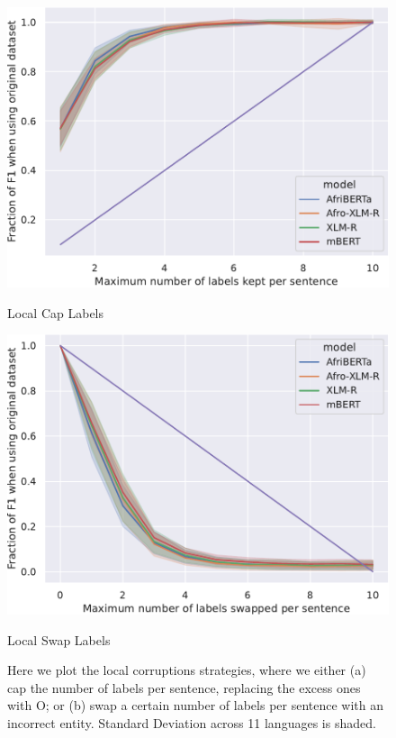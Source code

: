 \documentclass{article}
\begin{document}
\begin{figure}
    \centering
    \begin{minipage}[t]{0.45\linewidth}
        \centering
        \includegraphics[width=1\linewidth]{images/local_cap_labels.pdf}
        \caption{Local Cap Labels}
        \label{fig:local_cap_labels}
    \end{minipage}
    \begin{minipage}[t]{0.45\linewidth}
    \captionsetup{width=.8\linewidth}
        \centering
        \includegraphics[width=1\linewidth]{images/local_swap_labels.pdf}
        \caption{Local Swap Labels}
        \label{fig:local_swap_labels}
    \end{minipage}

    \caption*{Here we plot the local corruptions strategies, where we either (a) cap the number of labels per sentence, replacing the excess ones with O; or (b) swap a certain number of labels per sentence with an incorrect entity. Standard Deviation across 11 languages is shaded.}
\end{figure}
\end{document}
